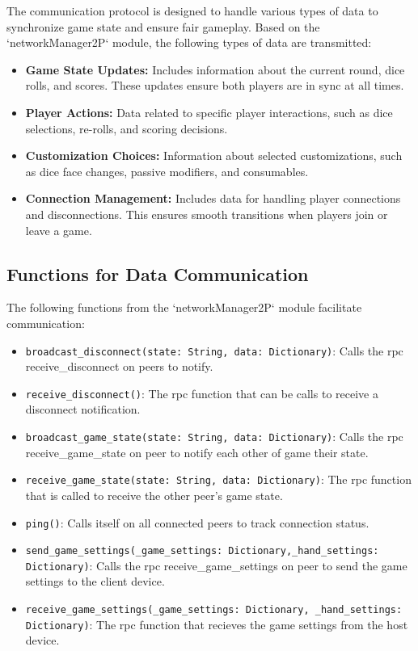\documentclass[12pt, titlepage]{article}
\begin{document}
The communication protocol is designed to handle various types of data to synchronize game state and ensure fair gameplay. Based on the `networkManager2P` module, the following types of data are transmitted:
\begin{itemize}
    \item \textbf{Game State Updates:} Includes information about the current round, dice rolls, and scores. These updates ensure both players are in sync at all times.
    \item \textbf{Player Actions:} Data related to specific player interactions, such as dice selections, re-rolls, and scoring decisions.
    \item \textbf{Customization Choices:} Information about selected customizations, such as dice face changes, passive modifiers, and consumables.
    \item \textbf{Connection Management:} Includes data for handling player connections and disconnections. This ensures smooth transitions when players join or leave a game.
\end{itemize}

\subsection{Functions for Data Communication}

The following functions from the `networkManager2P` module facilitate communication:
\begin{itemize}
    \item \texttt{broadcast\_disconnect(state: String, data: Dictionary)}: Calls the rpc receive\_disconnect on peers to notify.
    \item \texttt{receive\_disconnect()}: The rpc function that can be calls to receive a disconnect notification.
    \item \texttt{broadcast\_game\_state(state: String, data: Dictionary)}: Calls the rpc receive\_game\_state on peer to notify each other of game their state.
    \item \texttt{receive\_game\_state(state: String, data: Dictionary)}: The rpc function that is called to receive the other peer's game state.
    \item \texttt{ping()}: Calls itself on all connected peers to track connection status.
    \item \texttt{send\_game\_settings(\_game\_settings: Dictionary,\_hand\_settings: Dictionary)}: Calls the rpc receive\_game\_settings on peer to send the game settings to the client device.
    \item \texttt{receive\_game\_settings(\_game\_settings: Dictionary, \_hand\_settings: Dictionary)}: The rpc function that recieves the game settings from the host device.
\end{itemize}
\end{document}
